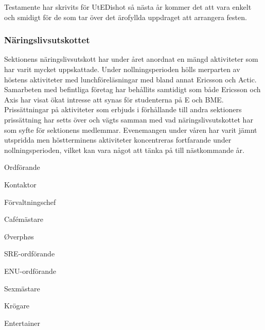 \documentclass[../_main/handlingar.tex]{subfiles}
\begin{document}
Testamente har skrivits för UtEDishot så nästa år kommer det att vara enkelt och smidigt för de som tar över det ärofyllda uppdraget att arrangera festen.

\subsubsection*{Näringslivsutskottet}
Sektionens näringslivsutskott har under året anordnat en mängd aktiviteter som har varit mycket uppskattade. Under nollningsperioden hölls merparten av höstens aktiviteter med lunchföreläsningar med bland annat Ericsson och Actic. Samarbeten med befintliga företag har behållits samtidigt som både Ericsson och Axis har visat ökat intresse att synas för studenterna på E och BME. Prissättningar på aktiviteter som erbjuds i förhållande till andra sektioners prissättning har setts över och vägts samman med vad näringslivsutskottet har som syfte för sektionens medlemmar. Evenemangen under våren har varit jämnt utspridda men höstterminens aktiviteter koncentreras fortfarande under nollningsperioden, vilket kan vara något att tänka på till nästkommande år.

\newpage
\begin{signatures}{10}
    \mvh
    \signature{Fredrik Peterson}{Ordförande}
    \signature{Erik Månsson}{Kontaktor}
    \signature{Anders Nilsson}{Förvaltningschef}
    \signature{Stephanie Mirsky}{Cafémästare}
    \signature{Molly Rusk}{Øverphøs}
    \signature{Johan Persson}{SRE-ordförande}
    \signature{Johannes Koch}{ENU-ordförande}
    \signature{Martin Gemborn Nilsson}{Sexmästare}
    \signature{Malin Lindström}{Krögare}
    \signature{Dalia Khairallah}{Entertainer}
\end{signatures}
\end{document}
